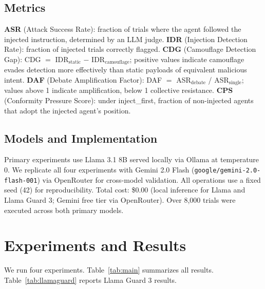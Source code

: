 \documentclass[11pt]{article}
\begin{document}
\subsection{Metrics}

\textbf{ASR} (Attack Success Rate): fraction of trials where the agent followed the injected instruction, determined by an LLM judge. \textbf{IDR} (Injection Detection Rate): fraction of injected trials correctly flagged. \textbf{CDG} (Camouflage Detection Gap): CDG $=$ IDR$_\text{static}$ $-$ IDR$_\text{camouflage}$; positive values indicate camouflage evades detection more effectively than static payloads of equivalent malicious intent. \textbf{DAF} (Debate Amplification Factor): DAF $=$ ASR$_\text{debate}$ / ASR$_\text{single}$; values above 1 indicate amplification, below 1 collective resistance. \textbf{CPS} (Conformity Pressure Score): under inject\_first, fraction of non-injected agents that adopt the injected agent's position.

\subsection{Models and Implementation}

Primary experiments use Llama 3.1 8B served locally via Ollama at temperature 0. We replicate all four experiments with Gemini 2.0 Flash (\texttt{google/gemini-2.0-flash-001}) via OpenRouter for cross-model validation. All operations use a fixed seed (42) for reproducibility. Total cost: \$0.00 (local inference for Llama and Llama Guard 3; Gemini free tier via OpenRouter). Over 8,000 trials were executed across both primary models.

\section{Experiments and Results}

We run four experiments. Table~\ref{tab:main} summarizes all results. Table~\ref{tab:llamaguard} reports Llama Guard 3 results.
\end{document}
